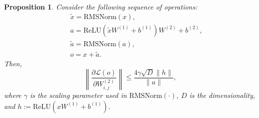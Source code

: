 \documentclass{article}
\newtheorem{proposition}{Proposition}
\begin{document}
\begin{proposition}
Consider the following sequence of operations:
\begin{align*}
    & \quad \tilde{x} = \mathrm{RMSNorm}(x), \\
    & \quad a = \mathrm{ReLU}(\tilde{x} W^{(1)} + b^{(1)})W^{(2)} + b^{(2)}, \\
    & \quad \tilde{a} = \mathrm{RMSNorm}(a), \\
    & \quad o = x + \tilde{a}.
\end{align*}
Then,
\begin{equation}
    \left\lVert \frac{\partial \mathcal{L}(o)}{\partial W_{i,j}^{(2)}} \right\rVert 
\leq  
\frac{4\gamma \sqrt{D} \| h \|}{\|a\|}, 
\end{equation}
where $\gamma$ is the scaling parameter used in $\mathrm{RMSNorm}(\cdot)$, $D$ is the dimensionality, and $h := \mathrm{ReLU}\left(x W^{(1)} + b^{(1)}\right)$.
\end{proposition}
\end{document}
